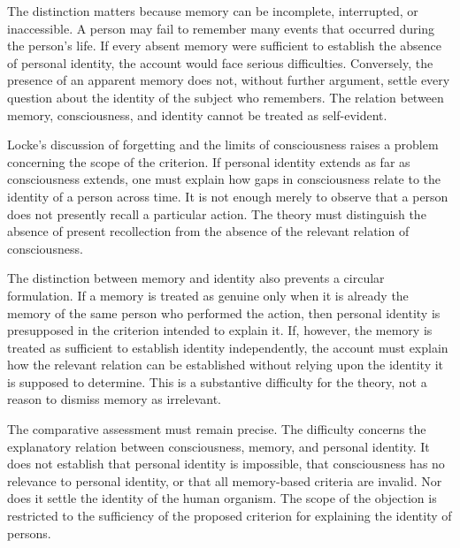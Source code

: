 \label{para:VS.B01.P01.C08.S08.SS08.P002}

The distinction matters because memory can be
incomplete, interrupted, or inaccessible. A person
may fail to remember many events that occurred
during the person's life. If every absent memory
were sufficient to establish the absence of personal
identity, the account would face serious difficulties.
Conversely, the presence of an apparent memory
does not, without further argument, settle every
question about the identity of the subject who
remembers. The relation between memory, consciousness,
and identity cannot be treated as self-evident.

\label{para:VS.B01.P01.C08.S08.SS08.P003}

Locke's discussion of forgetting and the limits
of consciousness raises a problem concerning the
scope of the criterion. If personal identity extends
as far as consciousness extends, one must explain
how gaps in consciousness relate to the identity
of a person across time. It is not enough merely
to observe that a person does not presently recall
a particular action. The theory must distinguish
the absence of present recollection from the
absence of the relevant relation of consciousness.

\label{para:VS.B01.P01.C08.S08.SS08.P004}

The distinction between memory and identity also
prevents a circular formulation. If a memory is
treated as genuine only when it is already the
memory of the same person who performed the action,
then personal identity is presupposed in the
criterion intended to explain it. If, however,
the memory is treated as sufficient to establish
identity independently, the account must explain
how the relevant relation can be established
without relying upon the identity it is supposed
to determine. This is a substantive difficulty
for the theory, not a reason to dismiss memory
as irrelevant.

\label{para:VS.B01.P01.C08.S08.SS08.P005}

The comparative assessment must remain precise.
The difficulty concerns the explanatory relation
between consciousness, memory, and personal identity.
It does not establish that personal identity is
impossible, that consciousness has no relevance
to personal identity, or that all memory-based
criteria are invalid. Nor does it settle the
identity of the human organism. The scope of
the objection is restricted to the sufficiency
of the proposed criterion for explaining the
identity of persons.

